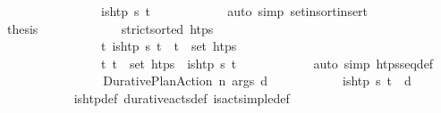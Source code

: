 \begin{isabellebody}
\ \ \ \ \ \ \ \ \ \ \ \ \ \ \ \ {\isacartoucheopen}is{\isacharunderscore}{\kern0pt}htp\ {\isacharparenleft}{\kern0pt}{\isasympi}{\isacharhash}{\kern0pt}{\isasympi}s{\isacharparenright}{\kern0pt}\ t\isactrlsub {\isasympi}{\isacartoucheclose}\isanewline
\ \ \ \ \ \ \ \ \ \ \isamarkupfalse%
\ {\isacharparenleft}{\kern0pt}auto\ simp{\isacharcolon}{\kern0pt}\ set{\isacharunderscore}{\kern0pt}insort{\isacharunderscore}{\kern0pt}insert{\isacharparenright}{\kern0pt}\isanewline
\ \ \ \ \ \ \ \ \isamarkupfalse%
\ {\isacharquery}{\kern0pt}thesis\ \isanewline
\ \ \ \ \ \ \ \ \ \ \isamarkupfalse%
\ {\isacartoucheopen}strict{\isacharunderscore}{\kern0pt}sorted\ htps{\isacartoucheclose}\ \isanewline
\ \ \ \ \ \ \ \ \ \ \ \ \ \ \ \ {\isacartoucheopen}{\isasymforall}t{\isachardot}{\kern0pt}\ is{\isacharunderscore}{\kern0pt}htp\ {\isacharparenleft}{\kern0pt}{\isasympi}{\isacharhash}{\kern0pt}{\isasympi}s{\isacharparenright}{\kern0pt}\ t\ {\isasymlongrightarrow}\ t\ {\isasymin}\ set\ htps{\isacartoucheclose}\ \isanewline
\ \ \ \ \ \ \ \ \ \ \ \ \ \ \ \ {\isacartoucheopen}{\isasymforall}t{\isachardot}{\kern0pt}\ t\ {\isasymin}\ set\ htps\ {\isasymlongrightarrow}\ is{\isacharunderscore}{\kern0pt}htp\ {\isacharparenleft}{\kern0pt}{\isasympi}{\isacharhash}{\kern0pt}{\isasympi}s{\isacharparenright}{\kern0pt}\ t{\isacartoucheclose}\isanewline
\ \ \ \ \ \ \ \ \ \ \isamarkupfalse%
\ {\isacharparenleft}{\kern0pt}auto\ simp{\isacharcolon}{\kern0pt}\ htps{\isacharunderscore}{\kern0pt}seq{\isacharunderscore}{\kern0pt}def{\isacharparenright}{\kern0pt}\isanewline
\ \ \ \ \ \ \isamarkupfalse%
\isanewline
\ \ \ \ \ \ \ \ \isamarkupfalse%
\ {\isacharparenleft}{\kern0pt}Durative{\isacharunderscore}{\kern0pt}Plan{\isacharunderscore}{\kern0pt}Action\ n\ args\ d{\isacharparenright}{\kern0pt}\isanewline
\ \ \ \ \ \ \ \ \isamarkupfalse%
\ \isamarkupfalse%
\ {\isachardoublequoteopen}is{\isacharunderscore}{\kern0pt}htp\ {\isacharparenleft}{\kern0pt}{\isasympi}{\isacharhash}{\kern0pt}{\isasympi}s{\isacharparenright}{\kern0pt}\ {\isacharparenleft}{\kern0pt}t\isactrlsub {\isasympi}\ {\isacharplus}{\kern0pt}\ d{\isacharparenright}{\kern0pt}{\isachardoublequoteclose}\isanewline
\ \ \ \ \ \ \ \ \ \ \isamarkupfalse%
\ is{\isacharunderscore}{\kern0pt}htp{\isacharunderscore}{\kern0pt}def\ durative{\isacharunderscore}{\kern0pt}acts{\isacharunderscore}{\kern0pt}def\ is{\isacharunderscore}{\kern0pt}act{\isacharunderscore}{\kern0pt}simple{\isacharunderscore}{\kern0pt}def\ \isamarkupfalse%

\end{isabellebody}
